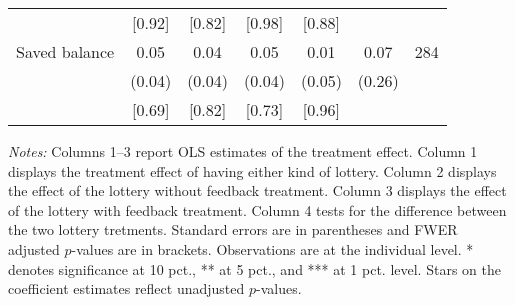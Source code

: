 \begin{table}[ht]
{\begin{threeparttable}
\begin{tabular}{l*{6}{c}}
          &   [0.92]&   [0.82]&   [0.98]&   [0.88]&         &         \\
Saved balance&     0.05&     0.04&     0.05&     0.01&     0.07&      284\\
          &   (0.04)&   (0.04)&   (0.04)&   (0.05)&   (0.26)&         \\
          &   [0.69]&   [0.82]&   [0.73]&   [0.96]&         &         \\
\bottomrule \end{tabular} \begin{tablenotes}[flushleft] \footnotesize \item \emph{Notes:} Columns 1--3 report OLS estimates of the treatment effect. Column 1 displays the treatment effect of having either kind of lottery. Column 2 displays the effect of the lottery without feedback treatment. Column 3 displays the effect of the lottery with feedback treatment. Column 4 tests for the difference between the two lottery tretments. Standard errors are in parentheses and FWER adjusted \(p\)-values are in brackets. Observations are at the individual level. * denotes significance at 10 pct., ** at 5 pct., and *** at 1 pct. level. Stars on the coefficient estimates reflect unadjusted \(p\)-values. \end{tablenotes} \end{threeparttable} } \end{table}

